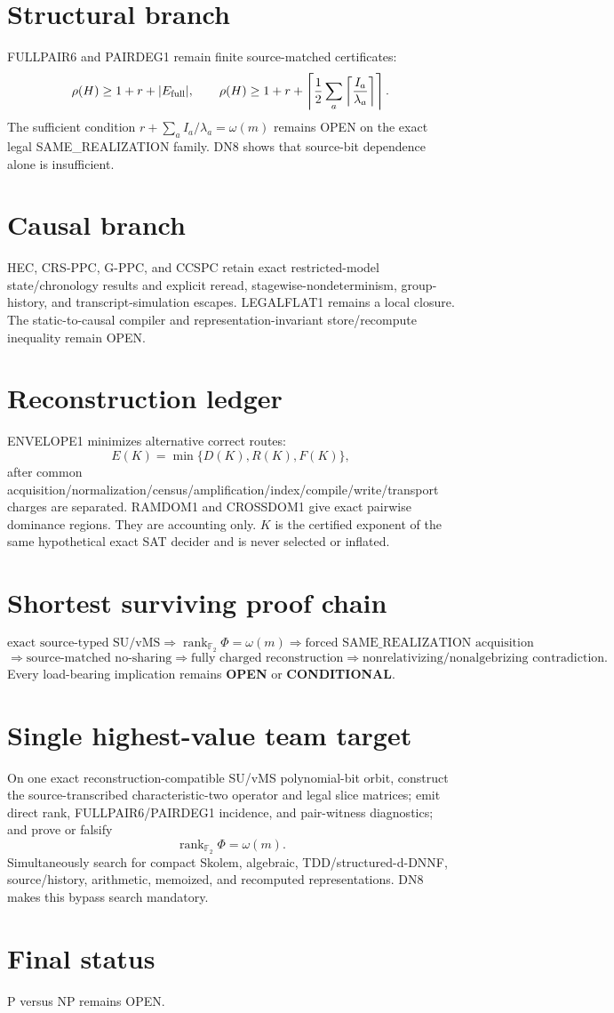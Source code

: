 \documentclass[11pt]{article}
\begin{document}
\section*{Structural branch}
FULLPAIR6 and PAIRDEG1 remain finite source-matched certificates:
\[
\rho(H)\ge1+r+|E_{\rm full}|,
\qquad
\rho(H)\ge1+r+\left\lceil\frac12\sum_a\left\lceil\frac{I_a}{\lambda_a}\right\rceil\right\rceil.
\]
The sufficient condition \(r+\sum_a I_a/\lambda_a=\omega(m)\) remains OPEN on the exact legal SAME\_REALIZATION family. DN8 shows that source-bit dependence alone is insufficient.

\section*{Causal branch}
HEC, CRS-PPC, G-PPC, and CCSPC retain exact restricted-model state/chronology results and explicit reread, stagewise-nondeterminism, group-history, and transcript-simulation escapes. LEGALFLAT1 remains a local closure. The static-to-causal compiler and representation-invariant store/recompute inequality remain OPEN.

\section*{Reconstruction ledger}
ENVELOPE1 minimizes alternative correct routes:
\[
E(K)=\min\{D(K),R(K),F(K)\},
\]
after common acquisition/normalization/census/amplification/index/compile/write/transport charges are separated. RAMDOM1 and CROSSDOM1 give exact pairwise dominance regions. They are accounting only. \(K\) is the certified exponent of the same hypothetical exact SAT decider and is never selected or inflated.

\section*{Shortest surviving proof chain}
\[
\text{exact source-typed SU/vMS}
\Longrightarrow
\operatorname{rank}_{\mathbb F_2}\Phi=\omega(m)
\Longrightarrow
\text{forced SAME\_REALIZATION acquisition}
\]
\[
\Longrightarrow
\text{source-matched no-sharing}
\Longrightarrow
\text{fully charged reconstruction}
\Longrightarrow
\text{nonrelativizing/nonalgebrizing contradiction}.
\]
Every load-bearing implication remains \textbf{OPEN} or \textbf{CONDITIONAL}.

\section*{Single highest-value team target}
On one exact reconstruction-compatible SU/vMS polynomial-bit orbit, construct the source-transcribed characteristic-two operator and legal slice matrices; emit direct rank, FULLPAIR6/PAIRDEG1 incidence, and pair-witness diagnostics; and prove or falsify
\[
\boxed{\operatorname{rank}_{\mathbb F_2}\Phi=\omega(m)}.
\]
Simultaneously search for compact Skolem, algebraic, TDD/structured-d-DNNF, source/history, arithmetic, memoized, and recomputed representations. DN8 makes this bypass search mandatory.

\section*{Final status}
P versus NP remains OPEN.
\end{document}
